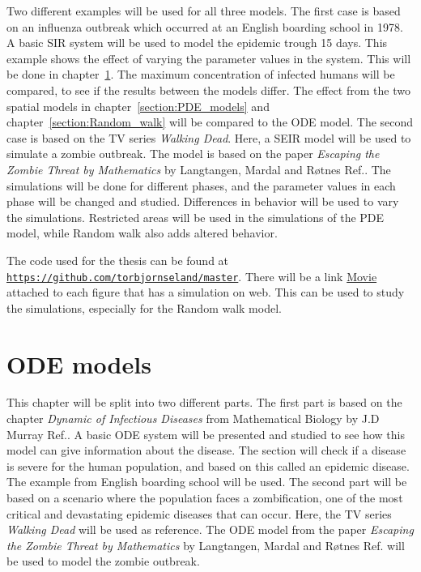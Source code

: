 \documentclass[%
twoside,                 %
final,                   %
chapterprefix=true,      %
open=right               %
10pt]{book}
\begin{document}
\vspace{3mm}




\vspace{3mm}


Two different examples will be used for all three models. The first case is based on an influenza outbreak which occurred at an English boarding school in 1978. A basic SIR system will be used to model the epidemic trough 15 days. This example shows the effect of varying the parameter values in the system. This will be done in chapter~\ref{section:ODE_models}. The maximum concentration of infected humans will be compared, to see if the results between the models differ. The effect from the two spatial models in chapter~\ref{section:PDE_models} and chapter~\ref{section:Random_walk} will be compared to the ODE model. The second case is based on the TV series \emph{Walking Dead}. Here, a SEIR model will be used to simulate a zombie outbreak. The model is based on the paper \emph{Escaping the Zombie Threat by Mathematics} by Langtangen, Mardal and Røtnes Ref.\cite{zombie-math}. The simulations will be done for different phases, and the parameter values in each phase will be changed and studied. Differences in behavior will be used to vary the simulations. Restricted areas will be used in the simulations of the PDE model, while Random walk also adds altered behavior.


\vspace{3mm}




\vspace{3mm}


The code used for the thesis can be found at \href{{https://github.com/torbjornseland/master}}{\nolinkurl{https://github.com/torbjornseland/master}}. There will be a link \href{{https://torbjornseland.github.io/master}}{Movie} attached to each figure that has a simulation on web. This can be used to study the simulations, especially for the Random walk model.






\chapter{ODE models}
\label{section:ODE_models}
This chapter will be split into two different parts. The first part is based on the chapter \emph{Dynamic of Infectious Diseases} from Mathematical Biology by J.D Murray Ref.\cite{murray2002mathematical}. A basic ODE system will be presented and studied to see how this model can give information about the disease. The section will check if a disease is severe for the human population, and based on this called an epidemic disease. The example from English boarding school will be used. The second part will be based on a scenario where the population faces a zombification, one of the most critical and devastating epidemic diseases that can occur. Here, the TV series \emph{Walking Dead} will be used as reference. The ODE model from the paper \emph{Escaping the Zombie Threat by Mathematics} by Langtangen, Mardal and Røtnes Ref.\cite{zombie-math} will be used to model the zombie outbreak.
\end{document}
